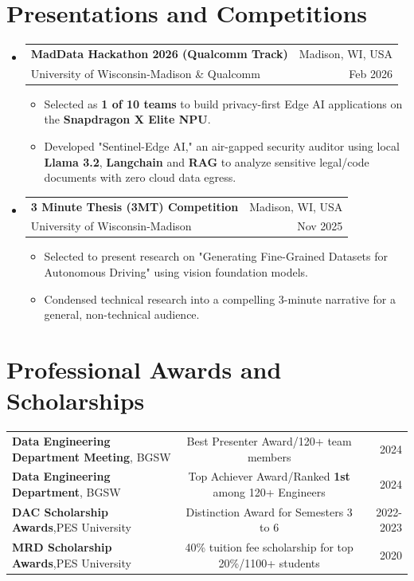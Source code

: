\documentclass[letterpaper,11pt]{article}
\makeatletter
\newcommand{\resumeItem}[1]{
  \item\small{
    {#1 \vspace{-2pt}}
  }
}
\newcommand{\resumeSubheading}[4]{
  \vspace{-2pt}\item
    \begin{tabular*}{0.97\textwidth}[t]{l@{\extracolsep{\fill}}r}
      \textbf{#1} & #2 \\
      \small#3 & \small #4 \\
    \end{tabular*}\vspace{-7pt}
}
\newcommand{\resumeSubHeadingListStart}{\begin{itemize}[leftmargin=0.15in, label={}]}
\newcommand{\resumeSubHeadingListEnd}{\end{itemize}}
\newcommand{\resumeItemListStart}{\begin{itemize}}
\newcommand{\resumeItemListEnd}{\end{itemize}\vspace{-5pt}}
\makeatother
\begin{document}
\section{Presentations and Competitions}
  \resumeSubHeadingListStart

  \resumeSubheading
      {MadData Hackathon 2026 (Qualcomm Track)}{Madison, WI, USA}
      {University of Wisconsin-Madison \& Qualcomm}{Feb 2026}
      \resumeItemListStart
        \resumeItem{Selected as \textbf{1 of 10 teams} to build privacy-first Edge AI applications on the \textbf{Snapdragon X Elite NPU}.}
        \resumeItem{Developed "Sentinel-Edge AI," an air-gapped security auditor using local \textbf{Llama 3.2}, \textbf{Langchain} and \textbf{RAG} to analyze sensitive legal/code documents with zero cloud data egress.}
      \resumeItemListEnd

    \resumeSubheading
      {3 Minute Thesis (3MT) Competition}{Madison, WI, USA}
      {University of Wisconsin-Madison}{Nov 2025}
      \resumeItemListStart
        \resumeItem{Selected to present research on "Generating Fine-Grained Datasets for Autonomous Driving" using vision foundation models.}
        \resumeItem{Condensed technical research into a compelling 3-minute narrative for a general, non-technical audience.}
      \resumeItemListEnd

  \resumeSubHeadingListEnd

\section{Professional Awards and Scholarships}
    
    \begin{tabular*}{\textwidth}{l@{\extracolsep{\fill}}cr}
      \textbf{Data Engineering Department Meeting}, BGSW & Best Presenter Award/120+ team members & {2024} \\
      \textbf{Data Engineering Department}, BGSW & Top Achiever Award/Ranked \textbf{1st} among 120+ Engineers & {2024} \\
      \textbf{DAC Scholarship Awards},PES University & Distinction Award for Semesters 3 to 6 & {2022-2023} \\
      \textbf{MRD Scholarship Awards},PES University & 40\% tuition fee scholarship for top 20\%/1100+ students & {2020}\\
    \end{tabular*}

\end{document}
